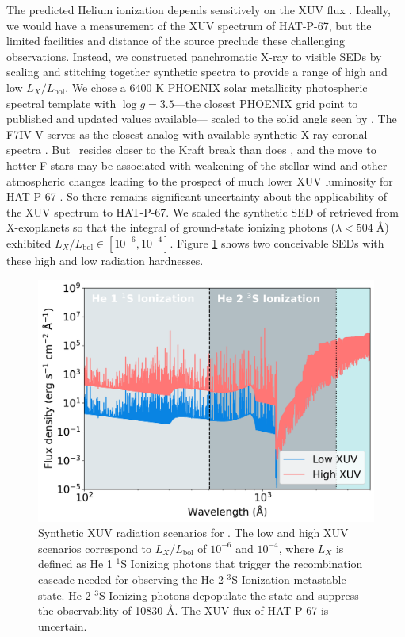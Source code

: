 \documentclass[twocolumn]{aastex631}
\newcommand{\hatp}{\object{HAT-P-67}~}
\newcommand{\hatpb}{\object{HAT-P-67 b}}
\begin{document}
The predicted Helium ionization depends sensitively on the XUV flux \citep{2019ApJ...881..133O}.  Ideally, we would have a measurement of the XUV spectrum of HAT-P-67, but the limited facilities and distance of the source preclude these challenging observations.  Instead, we constructed panchromatic X-ray to visible SEDs by scaling and stitching together synthetic spectra to provide a range of high and low $L_X/L_\mathrm{bol}$.  We chose a 6400 K PHOENIX \citep{husser13} solar metallicity photospheric spectral template with $\log{g}=3.5$---the closest PHOENIX grid point to published and updated values available--- scaled to the solid angle seen by \hatpb.  The F7IV-V  serves as the closest analog with available synthetic X-ray coronal spectra \citep{2011A&A...532A...6S}.  But \hatp resides closer to the Kraft break than does , and the move to hotter F stars may be associated with weakening of the stellar wind and other atmospheric changes leading to the prospect of much lower XUV luminosity for HAT-P-67 \citep{2022ApJ...930....7A}.  So there remains significant uncertainty about the applicability of the  XUV spectrum to HAT-P-67.  We scaled the synthetic SED of  retrieved from X-exoplanets \citep{2011A&A...532A...6S} so that the integral of ground-state ionizing photons ($\lambda<504\;$\AA) exhibited $L_X/L_\mathrm{bol} \in [10^{-6}, 10^{-4}]$.  Figure \ref{fig:XUV} shows two conceivable SEDs with these high and low radiation hardnesses.

\begin{figure}
    \includegraphics[width=\linewidth]{figures/XUV_flux_schematic.png}
    \caption{Synthetic XUV radiation scenarios for \hatpb.  The low and high XUV scenarios correspond to $L_X/L_\mathrm{bol}$ of $10^{-6}$ and $10^{-4}$, where $L_X$ is defined as He 1 $^1$S Ionizing photons that trigger the recombination cascade needed for observing the He 2 $^3$S Ionization metastable state.  He 2 $^3$S Ionizing photons depopulate the state and suppress the observability of  10830 \AA.  The XUV flux of HAT-P-67 is uncertain.}
    \label{fig:XUV}
\end{figure}
\end{document}
